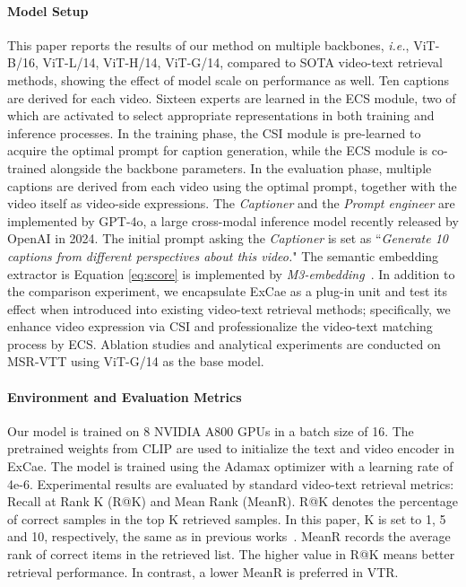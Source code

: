 \paragraph{\textbf{Model Setup}}
This paper reports the results of our method on multiple backbones, \textit{i.e.}, ViT-B/16, ViT-L/14, ViT-H/14, ViT-G/14, compared to SOTA video-text retrieval methods, showing the effect of model scale on performance as well. Ten captions are derived for each video. 
Sixteen experts are learned in the ECS module, two of which are activated to select appropriate representations in both training and inference processes.  In the training phase, the CSI module is pre-learned to acquire the optimal prompt for caption generation, while the ECS module is co-trained alongside the backbone parameters.
In the evaluation phase, multiple captions are derived from each video using the optimal prompt, together with the video itself as video-side expressions.
The \textit{Captioner} and the \textit{Prompt engineer} are implemented by GPT-4o, a large cross-modal inference model recently released by OpenAI in 2024. The initial prompt asking the \textit{Captioner} is set as ``\textit{Generate 10 captions from different perspectives about this video.}" The semantic embedding extractor is Equation \eqref{eq:score} is  implemented by \textit{M3-embedding}~\cite{chen2024bge}.
In addition to the comparison experiment, we encapsulate ExCae as a plug-in unit and test its effect when introduced into existing video-text retrieval methods; specifically, we enhance video expression via CSI and professionalize the video-text matching process by ECS.
Ablation studies and analytical experiments are conducted on MSR-VTT using ViT-G/14 as the base model. 


\paragraph{\textbf{Environment and Evaluation Metrics}}
Our model is trained on 8 NVIDIA  A800 GPUs in a batch size of 16. The pretrained weights from CLIP \cite{radford2021learning} are used to initialize the text and video encoder in ExCae. The model is trained using the Adamax optimizer with a learning rate of 4e-6. 
Experimental results are evaluated by standard video-text retrieval metrics: Recall at Rank K (R@K) and Mean Rank (MeanR). R@K denotes the percentage of correct samples in the top K retrieved samples. In this paper, K is set to 1, 5 and 10, respectively, the same as in previous works~\cite{xue2022clip,jiang2023dual}.
MeanR records the average rank of correct items in the retrieved list. The higher value in R@K means better retrieval performance. In contrast, a lower MeanR is preferred in VTR.

